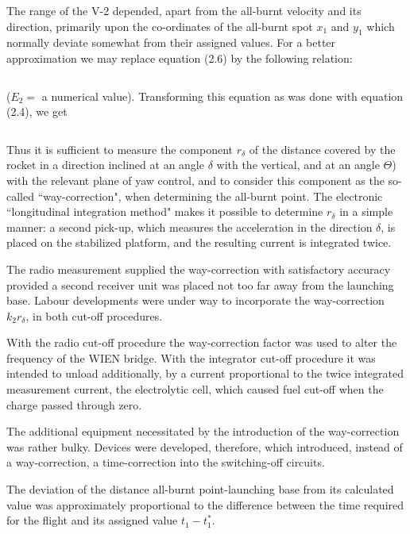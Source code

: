 \documentclass[12pt, a4paper]{article}
\begin{document}
The range of the V-2 depended, apart from the all-burnt velocity and its direction, primarily upon the co-ordinates of the all-burnt spot $x_{1}$ and $y_{1}$ which normally deviate somewhat from their assigned values. For a better approximation we may replace equation (2.6) by the following relation:

\begin{equation}
\end{equation}

($E_{2}=$ a numerical value). Transforming this equation as was done with equation (2.4), we get

\begin{equation}
\end{equation}

Thus it is sufficient to measure the component $r_{\delta}$ of the distance covered by the rocket in a direction inclined at an angle $\delta$ with the vertical, and at an angle $\Theta$) with the relevant plane of yaw control, and to consider this component as the so-called ``way-correction", when determining the all-burnt point. The electronic ``longitudinal integration method" makes it possible to determine $r_{\delta}$ in a simple manner: a second pick-up, which measures the acceleration in the direction $\delta$, is placed on the stabilized platform, and the resulting current is integrated twice.

The radio measurement supplied the way-correction with satisfactory accuracy provided a second receiver unit was placed not too far away from the launching base. Labour developments were under way to incorporate the way-correction $k_{2}r_{\delta}$, in both cut-off procedures.

With the radio cut-off procedure the way-correction factor was used to alter the frequency of the WIEN bridge. With the integrator cut-off procedure it was intended to unload additionally, by a current proportional to the twice integrated measurement current, the electrolytic cell, which caused fuel cut-off when the charge passed through zero.

The additional equipment necessitated by the introduction of the way-correction was rather bulky. Devices were developed, therefore, which introduced, instead of a way-correction, a time-correction into the switching-off circuits.

The deviation of the distance all-burnt point-launching base from its calculated value was approximately proportional to the difference between the time required for the flight and its assigned value $t_{1}-t_{1}^{*}$.
\end{document}
